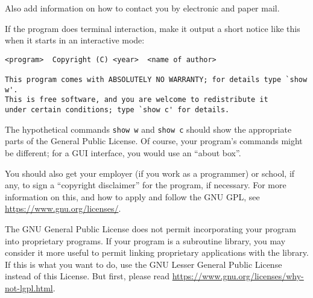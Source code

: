 Also add information on how to contact you by electronic and paper mail.

If the program does terminal interaction, make it output a short
notice like this when it starts in an interactive mode:

{\footnotesize
\begin{verbatim}
<program>  Copyright (C) <year>  <name of author>

This program comes with ABSOLUTELY NO WARRANTY; for details type `show w'.
This is free software, and you are welcome to redistribute it
under certain conditions; type `show c' for details.
\end{verbatim}
}

The hypothetical commands {\tt show w} and {\tt show c} should show
the appropriate
parts of the General Public License.  Of course, your program's commands
might be different; for a GUI interface, you would use an ``about box''.

You should also get your employer (if you work as a programmer) or
school, if any, to sign a ``copyright disclaimer'' for the program, if
necessary.  For more information on this, and how to apply and follow
the GNU GPL, see \url{https://www.gnu.org/licenses/}.

The GNU General Public License does not permit incorporating your
program into proprietary programs.  If your program is a subroutine
library, you may consider it more useful to permit linking proprietary
applications with the library.  If this is what you want to do, use
the GNU Lesser General Public License instead of this License.  But
first, please read \url{https://www.gnu.org/licenses/why-not-lgpl.html}.
